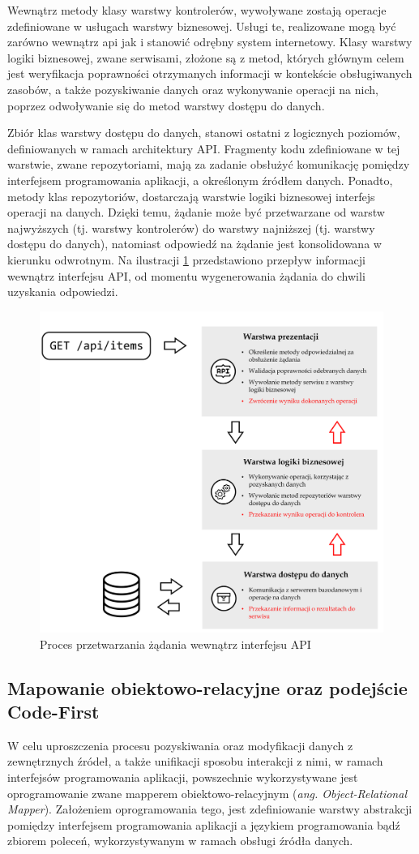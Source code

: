 Wewnątrz metody klasy warstwy kontrolerów, wywoływane zostają operacje zdefiniowane w usługach warstwy biznesowej. Usługi te, realizowane mogą być zarówno wewnątrz api jak i stanowić odrębny system internetowy. Klasy warstwy logiki biznesowej, zwane serwisami, złożone są z metod, których głównym celem jest weryfikacja poprawności otrzymanych informacji w kontekście obsługiwanych zasobów, a także pozyskiwanie danych oraz wykonywanie operacji na nich, poprzez odwoływanie się do metod warstwy dostępu do danych.

Zbiór klas warstwy dostępu do danych, stanowi ostatni z logicznych poziomów, definiowanych w ramach architektury API. Fragmenty kodu zdefiniowane w tej warstwie, zwane repozytoriami, mają za zadanie obsłużyć komunikację pomiędzy interfejsem programowania aplikacji, a określonym źródłem danych. Ponadto, metody klas repozytoriów, dostarczają warstwie logiki biznesowej interfejs operacji na danych. Dzięki temu, żądanie może być przetwarzane od warstw najwyższych (tj. warstwy kontrolerów) do warstwy najniższej (tj. warstwy dostępu do danych), natomiast odpowiedź na żądanie jest konsolidowana w kierunku odwrotnym. Na ilustracji \ref{fig:architektura-api} przedstawiono przepływ informacji wewnątrz interfejsu API, od momentu wygenerowania żądania do chwili uzyskania odpowiedzi.

\begin{figure}[ht]
 \centering
  \includegraphics[width=0.6\linewidth]{rys03/architektura-api}
 \caption{Proces przetwarzania żądania wewnątrz interfejsu API}
 \label{fig:architektura-api}
\end{figure}
 
\subsection*{Mapowanie obiektowo-relacyjne oraz podejście Code-First}
W celu uproszczenia procesu pozyskiwania oraz modyfikacji danych z zewnętrznych źródeł, a także unifikacji sposobu interakcji z nimi, w ramach interfejsów programowania aplikacji, powszechnie wykorzystywane jest oprogramowanie zwane mapperem obiektowo-relacyjnym (\textit{ang. Object-Relational Mapper}). Założeniem oprogramowania tego, jest zdefiniowanie warstwy abstrakcji pomiędzy interfejsem programowania aplikacji a językiem programowania bądź zbiorem poleceń, wykorzystywanym w ramach obsługi źródła danych.

